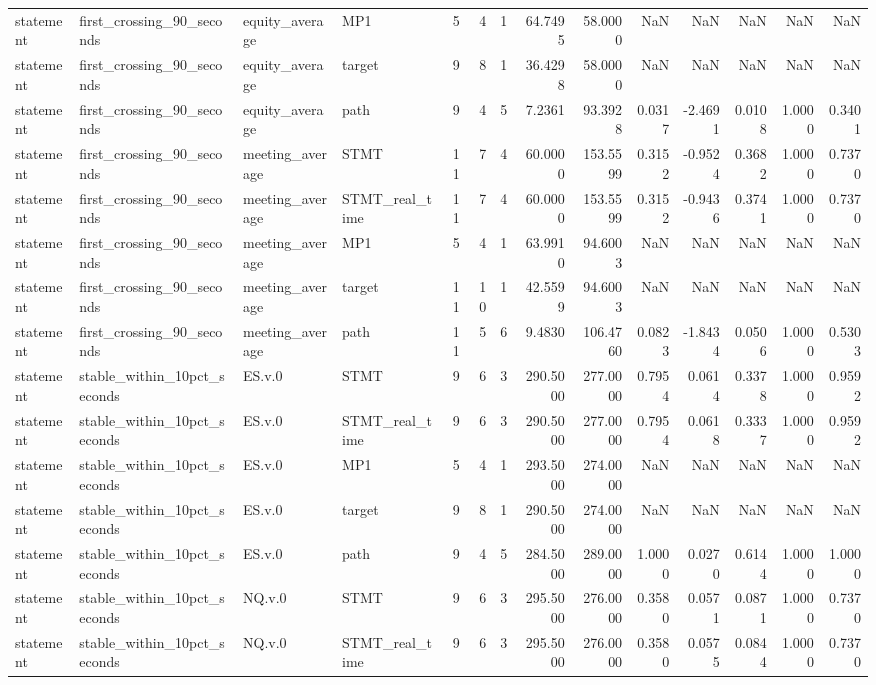 \begin{tabular}{llllrrrrrrrrrr}
statement & first_crossing_90_seconds & equity_average & MP1 & 5 & 4 & 1 & 64.7495 & 58.0000 & NaN & NaN & NaN & NaN & NaN \\
statement & first_crossing_90_seconds & equity_average & target & 9 & 8 & 1 & 36.4298 & 58.0000 & NaN & NaN & NaN & NaN & NaN \\
statement & first_crossing_90_seconds & equity_average & path & 9 & 4 & 5 & 7.2361 & 93.3928 & 0.0317 & -2.4691 & 0.0108 & 1.0000 & 0.3401 \\
statement & first_crossing_90_seconds & meeting_average & STMT & 11 & 7 & 4 & 60.0000 & 153.5599 & 0.3152 & -0.9524 & 0.3682 & 1.0000 & 0.7370 \\
statement & first_crossing_90_seconds & meeting_average & STMT_real_time & 11 & 7 & 4 & 60.0000 & 153.5599 & 0.3152 & -0.9436 & 0.3741 & 1.0000 & 0.7370 \\
statement & first_crossing_90_seconds & meeting_average & MP1 & 5 & 4 & 1 & 63.9910 & 94.6003 & NaN & NaN & NaN & NaN & NaN \\
statement & first_crossing_90_seconds & meeting_average & target & 11 & 10 & 1 & 42.5599 & 94.6003 & NaN & NaN & NaN & NaN & NaN \\
statement & first_crossing_90_seconds & meeting_average & path & 11 & 5 & 6 & 9.4830 & 106.4760 & 0.0823 & -1.8434 & 0.0506 & 1.0000 & 0.5303 \\
statement & stable_within_10pct_seconds & ES.v.0 & STMT & 9 & 6 & 3 & 290.5000 & 277.0000 & 0.7954 & 0.0614 & 0.3378 & 1.0000 & 0.9592 \\
statement & stable_within_10pct_seconds & ES.v.0 & STMT_real_time & 9 & 6 & 3 & 290.5000 & 277.0000 & 0.7954 & 0.0618 & 0.3337 & 1.0000 & 0.9592 \\
statement & stable_within_10pct_seconds & ES.v.0 & MP1 & 5 & 4 & 1 & 293.5000 & 274.0000 & NaN & NaN & NaN & NaN & NaN \\
statement & stable_within_10pct_seconds & ES.v.0 & target & 9 & 8 & 1 & 290.5000 & 274.0000 & NaN & NaN & NaN & NaN & NaN \\
statement & stable_within_10pct_seconds & ES.v.0 & path & 9 & 4 & 5 & 284.5000 & 289.0000 & 1.0000 & 0.0270 & 0.6144 & 1.0000 & 1.0000 \\
statement & stable_within_10pct_seconds & NQ.v.0 & STMT & 9 & 6 & 3 & 295.5000 & 276.0000 & 0.3580 & 0.0571 & 0.0871 & 1.0000 & 0.7370 \\
statement & stable_within_10pct_seconds & NQ.v.0 & STMT_real_time & 9 & 6 & 3 & 295.5000 & 276.0000 & 0.3580 & 0.0575 & 0.0844 & 1.0000 & 0.7370 \\

\end{tabular}

